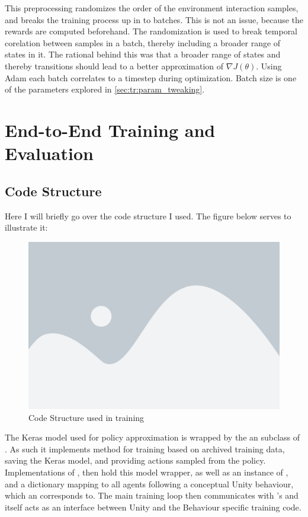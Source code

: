 \noindent
This preprocessing randomizes the order of the environment interaction samples, and breaks the training process up in to batches. This is not an issue, because the rewards are computed beforehand. The randomization is used to break temporal corelation between samples in a batch, thereby including a broader range of states in it. The rational behind this was that a broader range of states and thereby transitions should lead to a better approximation of $\nabla J(\theta)$. Using Adam each batch correlates to a timestep during optimization. Batch size is one of the parameters explored in \ref{sec:tr:param_tweaking}.

\section{End-to-End Training and Evaluation}\label{sec:ip:training_testing}

\subsection{Code Structure}\label{subsec:ip:tt:class_structure}
Here I will briefly go over the code structure I used. The figure below serves to illustrate it:

\begin{figure}[H]
    \centering
    \includegraphics[width=0.7\linewidth]{figures/placeholder.png}
    \caption{Code Structure used in training}
    \label{fig:code_structure}
\end{figure}

\noindent
The Keras model used for policy approximation is wrapped by the an subclass of . As such it implements method for training based on archived training data, saving the Keras model, and providing actions sampled from the policy. Implementations of , then hold this model wrapper, as well as an instance of , and a dictionary mapping  to all agents following a conceptual Unity behaviour, which an  corresponds to. The main training loop then communicates with 's and itself acts as an interface between Unity and the Behaviour specific training code. 



